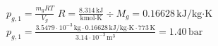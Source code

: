\( p_{g,1} = \frac{m_g R T}{V_g} \)  
\( R = \frac{8.314 \, \text{kJ}}{\text{kmol·K}} \div M_g = 0.16628 \, \text{kJ/kg·K} \)  
\( p_{g,1} = \frac{3.5479 \cdot 10^{-3} \, \text{kg} \cdot 0.16628 \, \text{kJ/kg·K} \cdot 773 \, \text{K}}{3.14 \cdot 10^{-3} \, \text{m}^3} = 1.40 \, \text{bar} \)